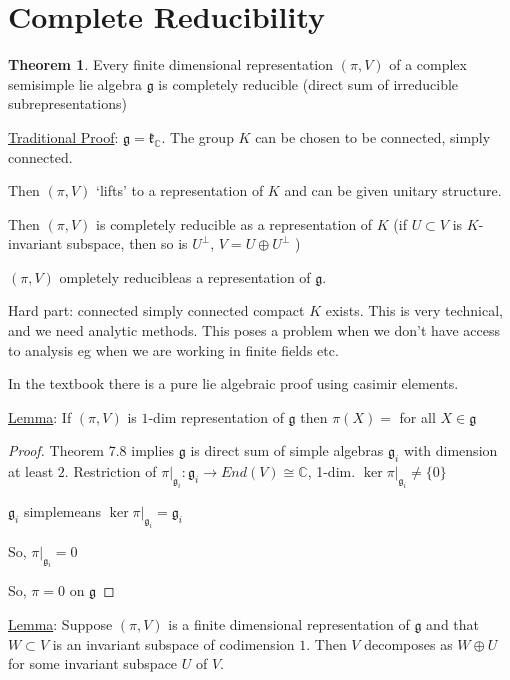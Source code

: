 \documentclass{article}
\theoremstyle{definition}
\newtheorem{theorem}{Theorem}
\begin{document}
\section*{Complete Reducibility}

\begin{theorem}
    Every finite dimensional representation \((\pi, V)\) of a complex semisimple lie algebra \(\mathfrak{g}\) is completely reducible (direct sum of irreducible subrepresentations)  
\end{theorem}

\underline{Traditional Proof}: \(\mathfrak{g} = \mathfrak{k}_\mathbb{C}\). The group \(K\) can be chosen to be connected, simply connected.

Then \((\pi , V)\) `lifts' to a representation of \(K\) and can be given unitary structure.

Then \((\pi, V)\) is completely reducible as a representation of \(K\) (if \(U \subset V\) is \(K\)-invariant subspace, then so is \(U ^{\perp} \), \(V = U \oplus U ^{\perp} \)  ) 

\((\pi, V)\) ompletely reducibleas a representation of \(\mathfrak{g}\).

Hard part: connected simply connected compact \(K\) exists. This is very technical, and we need analytic methods. This poses a problem when we don't have access to analysis eg when we are working in finite fields etc.

In the textbook there is a pure lie algebraic proof using casimir elements.

\underline{Lemma}: If \((\pi,V)\) is \(1\)-dim representation of \(\mathfrak{g}\) then \(\pi(X)=\) for all \(X\in \mathfrak{g}\)   

\begin{proof}
    Theorem 7.8 implies \(\mathfrak{g}\) is direct sum of simple algebras \(\mathfrak{g}_i\) with dimension at least \(2\). Restriction of \(\pi|_{\mathfrak{g}_i}:\mathfrak{g}_i \to End(V) \cong \mathbb{C}\), 1-dim. \(\ker \pi |_{\mathfrak{g}_i}\neq \{ 0 \} \)
    
    \(\mathfrak{g}_i\) simplemeans \(\ker \pi |_{\mathfrak{g}_i}= \mathfrak{g}_i\) 

    So, \(\pi |_{\mathfrak{g}_i}=0\)
    
    So, \(\pi = 0\) on \(\mathfrak{g}\)  
    
\end{proof}

\underline{Lemma}: Suppose \((\pi , V)\) is a finite dimensional representation of \(\mathfrak{g}\) and that \(W \subset V\) is an invariant subspace of codimension \(1\). Then \(V\) decomposes as \(W \oplus U\) for some invariant subspace \(U\) of \(V\).
\end{document}
